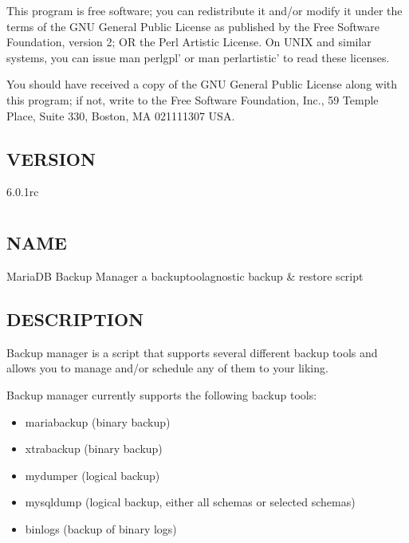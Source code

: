 \documentclass[letterpaper,10pt,english]{sphinxmanual}
\begin{document}
\sphinxAtStartPar
This program is free software; you can redistribute it and/or modify it under
the terms of the GNU General Public License as published by the Free Software
Foundation, version 2; OR the Perl Artistic License.  On UNIX and similar
systems, you can issue \textasciigrave{}man perlgpl’ or \textasciigrave{}man perlartistic’ to read these
licenses.

\sphinxAtStartPar
You should have received a copy of the GNU General Public License along with
this program; if not, write to the Free Software Foundation, Inc., 59 Temple
Place, Suite 330, Boston, MA  02111\sphinxhyphen{}1307  USA.


\section{VERSION}
\label{\detokenize{mariadb-archiver:version}}
\sphinxAtStartPar
{} 6.0.1rc


\chapter{}
\label{\detokenize{mariadb-backup-manager:mariadb-backup-manager}}\label{\detokenize{mariadb-backup-manager::doc}}

\section{NAME}
\label{\detokenize{mariadb-backup-manager:name}}
\sphinxAtStartPar
MariaDB Backup Manager \sphinxhyphen{} a backup\sphinxhyphen{}tool\sphinxhyphen{}agnostic backup \& restore script


\section{DESCRIPTION}
\label{\detokenize{mariadb-backup-manager:description}}
\sphinxAtStartPar
Backup manager is a script that supports several different backup tools and
allows you to manage and/or schedule any of them to your liking.

\sphinxAtStartPar
Backup manager currently supports the following backup tools:
\begin{itemize}
\item {} 
\sphinxAtStartPar
mariabackup (binary backup)

\item {} 
\sphinxAtStartPar
xtrabackup (binary backup)

\item {} 
\sphinxAtStartPar
mydumper (logical backup)

\item {} 
\sphinxAtStartPar
mysqldump (logical backup, either all schemas or selected schemas)

\item {} 
\sphinxAtStartPar
binlogs (backup of binary logs)

\end{itemize}
\end{document}

